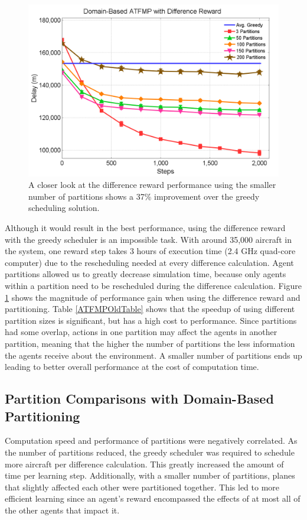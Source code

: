 \documentclass[smallcondensed]{svjour3}
\begin{document}
\begin{figure}
\centering
\includegraphics[width=.75\columnwidth]{ATFMPOldDvsGreedy}
\caption{A closer look at the difference reward performance using the smaller number of partitions shows a 37\% improvement over the greedy scheduling solution.}
\label{ATFMPOldDvsGreedy}
\end{figure}

Although it would result in the best performance, using the difference reward with the greedy scheduler is an impossible task. With around 35,000 aircraft in the system, one reward step takes 3 hours of execution time (2.4 GHz quad-core computer) due to the rescheduling needed at every difference calculation. Agent partitions allowed us to greatly decrease simulation time, because only agents within a partition need to be rescheduled during the difference calculation. Figure \ref{ATFMPOldDvsGreedy} shows the magnitude of performance gain when using the difference reward and partitioning. Table \ref{ATFMPOldTable} shows that the speedup of using different partition sizes is significant, but has a high cost to performance. Since partitions had some overlap, actions in one partition may affect the agents in another partition, meaning that the higher the number of partitions the less information the agents receive about the environment. A smaller number of partitions ends up leading to better overall performance at the cost of computation time.

\subsection{Partition Comparisons with Domain-Based Partitioning}
Computation speed and performance of partitions were negatively correlated. As the number of partitions reduced, the greedy scheduler was required to schedule more aircraft per difference calculation. This greatly increased the amount of time per learning step. Additionally, with a smaller number of partitions, planes that slightly affected each other were partitioned together. This led to more efficient learning since an agent's reward encompassed the effects of at most all of the other agents that impact it. 
\end{document}

